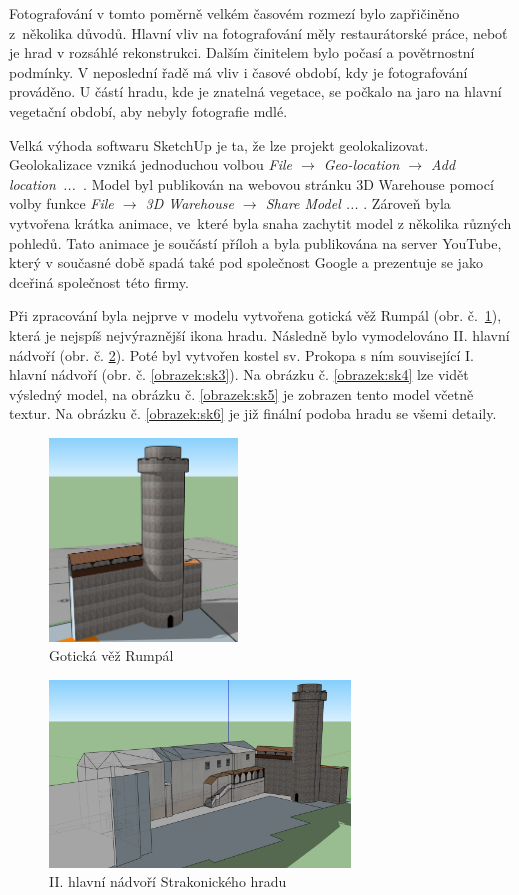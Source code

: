 \documentclass[thesis=M,czech]{FITthesis}[2012/06/26]
\begin{document}
Fotografování v tomto poměrně velkém časovém rozmezí bylo zapřičiněno z~několika důvodů. Hlavní vliv na fotografování měly restaurátorské práce, neboť je hrad v rozsáhlé rekonstrukci. Dalším činitelem bylo počasí a povětrnostní podmínky. V neposlední řadě má vliv i časové období, kdy je fotografování prováděno. U částí hradu, kde je znatelná vegetace, se počkalo na jaro na hlavní vegetační období, aby nebyly fotografie mdlé.

Velká výhoda softwaru SketchUp je ta, že lze projekt geolokalizovat. Geolokalizace vzniká jednoduchou volbou \textit{File $\rightarrow$ Geo-location $\rightarrow$ Add \mbox{location ... }}. Model byl publikován na webovou stránku 3D Warehouse pomocí volby funkce \textit{File $\rightarrow$ 3D Warehouse $\rightarrow$ Share Model ... }. Zároveň byla vytvořena krátka animace, ve~které byla snaha zachytit model z několika různých pohledů. Tato animace je součástí příloh a byla publikována na server YouTube, který v současné době spadá také pod společnost Google a prezentuje se jako dceřiná společnost této firmy. 

Při zpracování byla nejprve v modelu vytvořena gotická věž Rumpál (obr. č.~\ref{obrazek:sk1}), která je nejspíš nejvýraznější ikona hradu. Následně bylo vymodelováno II. hlavní nádvoří (obr. č. \ref{obrazek:sk2}). Poté byl vytvořen kostel sv. Prokopa s ním související I. hlavní nádvoří (obr. č. \ref{obrazek:sk3}). Na obrázku č. \ref{obrazek:sk4} lze vidět výsledný model, na obrázku č. \ref{obrazek:sk5} je zobrazen tento model včetně textur. Na obrázku č. \ref{obrazek:sk6} je již finální podoba hradu se všemi detaily.

\begin{figure}[h]
	\centering
	\includegraphics[width=5cm]{pics/sketchup1.png}
	\caption{Gotická věž Rumpál}
	\label{obrazek:sk1}
\end{figure}

\begin{figure}[h]
	\centering
	\includegraphics[width=8cm]{pics/sketchup2.png}
	\caption{II. hlavní nádvoří Strakonického hradu}
	\label{obrazek:sk2}
\end{figure}
\end{document}
